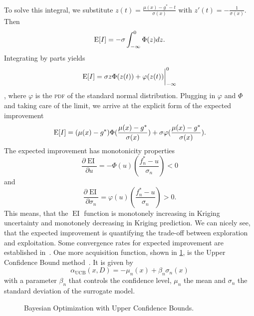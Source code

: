 To solve this integral, we substitute
\(
    z(t) = \frac{\mu(x)-g^{*}-t}{\sigma(x)}
\)
with \( z'(t)= -\frac{1}{\sigma(x)} \). Then
\[
    \operatorname*{E}[I] = -\sigma \int_{-\infty}^{0} \Phi(z) dz.
\]
Integrating by parts yields
\[
    \operatorname*{E}[I] = \sigma z \Phi(z(t)) + \varphi(z(t)) \bigg|_{-\infty}^{0}
\],
where $\varphi$ is the \textsc{pdf} of the standard normal distribution.
Plugging in $\varphi$ and $\Phi$ and taking care of the limit, we arrive at the explicit form of the expected improvement
\[
    \operatorname*{E}[I] = (\mu(x)-g^{*}) \Phi(\frac{\mu(x)-g^{*}}{\sigma(x)}) + \sigma \varphi(\frac{\mu(x)-g^{*}}{\sigma(x)}).
\]
The expected improvement has monotonicity properties~\cite{jones1998efficient}
\[
    \frac{\partial \operatorname{EI}}{\partial u} = - \Phi(u) \left(\frac{f_{n}^{*}-u}{\sigma_{n}}\right) < 0
\]
and
\[
    \frac{\partial \operatorname{EI}}{\partial \sigma_{n}} = \varphi(u) \left( \frac{f_{n}^{*}-u}{\sigma_{n}} \right) > 0.
\]
This means, that the $\operatorname{EI}$ function is monotonely increasing in Kriging uncertainty and monotonely decreasing in Kriging prediction. 
We can nicely see, that the expected improvement is quantifying the trade-off between exploration and exploitation.
Some convergence rates for expected improvement are established in~\cite{bull2011convergence}.
One more acquisition function, shown in \cref{fig:bayes_opt_ucb}, is the Upper Confidence Bound method~\cite{auer2002using}.
It is given by
\[
    \alpha_{\operatorname{UCB}}(x,D) = -\mu_{n}(x) + \beta_{n}\sigma_{n}(x)
\]
with a parameter $\beta_{n}$ that controls the confidence level, $\mu_{n}$ the mean and $\sigma_{n}$ the standard deviation of the surrogate model.






\begin{figure}[t]
    \centering
    
    \caption{Bayesian Optimization with Upper Confidence Bounds.}
    \label{fig:bayes_opt_ucb}
\end{figure}





